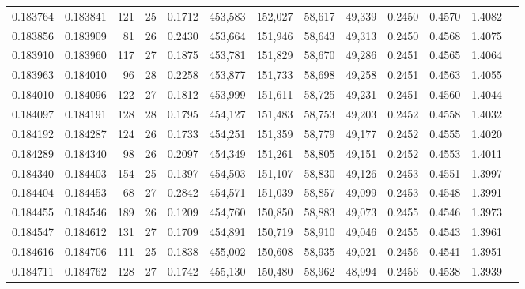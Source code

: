\begin{tabular}{rrrrrrrrrrrrr}
0.183764 & 0.183841 & 121 &  25 &                                     0.1712 & 453,583 & 152,027 &  58,617 &  49,339 & 0.2450 & 0.4570 & 1.4082 \\
0.183856 & 0.183909 &  81 &  26 &                                     0.2430 & 453,664 & 151,946 &  58,643 &  49,313 & 0.2450 & 0.4568 & 1.4075 \\
0.183910 & 0.183960 & 117 &  27 &                                     0.1875 & 453,781 & 151,829 &  58,670 &  49,286 & 0.2451 & 0.4565 & 1.4064 \\
0.183963 & 0.184010 &  96 &  28 &                                     0.2258 & 453,877 & 151,733 &  58,698 &  49,258 & 0.2451 & 0.4563 & 1.4055 \\
0.184010 & 0.184096 & 122 &  27 &                                     0.1812 & 453,999 & 151,611 &  58,725 &  49,231 & 0.2451 & 0.4560 & 1.4044 \\
0.184097 & 0.184191 & 128 &  28 &                                     0.1795 & 454,127 & 151,483 &  58,753 &  49,203 & 0.2452 & 0.4558 & 1.4032 \\
0.184192 & 0.184287 & 124 &  26 &                                     0.1733 & 454,251 & 151,359 &  58,779 &  49,177 & 0.2452 & 0.4555 & 1.4020 \\
0.184289 & 0.184340 &  98 &  26 &                                     0.2097 & 454,349 & 151,261 &  58,805 &  49,151 & 0.2452 & 0.4553 & 1.4011 \\
0.184340 & 0.184403 & 154 &  25 &                                     0.1397 & 454,503 & 151,107 &  58,830 &  49,126 & 0.2453 & 0.4551 & 1.3997 \\
0.184404 & 0.184453 &  68 &  27 &                                     0.2842 & 454,571 & 151,039 &  58,857 &  49,099 & 0.2453 & 0.4548 & 1.3991 \\
0.184455 & 0.184546 & 189 &  26 &                                     0.1209 & 454,760 & 150,850 &  58,883 &  49,073 & 0.2455 & 0.4546 & 1.3973 \\
0.184547 & 0.184612 & 131 &  27 &                                     0.1709 & 454,891 & 150,719 &  58,910 &  49,046 & 0.2455 & 0.4543 & 1.3961 \\
0.184616 & 0.184706 & 111 &  25 &                                     0.1838 & 455,002 & 150,608 &  58,935 &  49,021 & 0.2456 & 0.4541 & 1.3951 \\
0.184711 & 0.184762 & 128 &  27 &                                     0.1742 & 455,130 & 150,480 &  58,962 &  48,994 & 0.2456 & 0.4538 & 1.3939 \\

\end{tabular}
